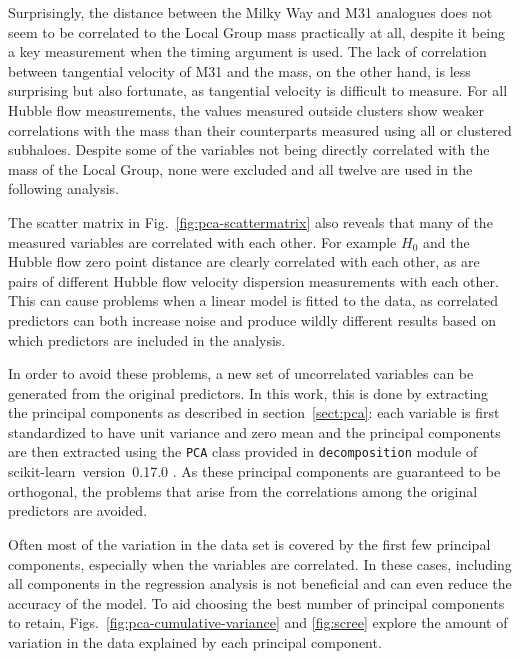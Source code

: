\documentclass[english, twoside]{HYgradu}
\begin{document}
Surprisingly, the distance between the Milky Way and M31 analogues does not seem to be correlated to the Local Group mass practically at all, despite it being a key measurement when the timing argument is used. The lack of correlation between tangential velocity of M31 and the mass, on the other hand, is less surprising but also fortunate, as tangential velocity is difficult to measure. For all Hubble flow measurements, the values measured outside clusters show weaker correlations with the mass than their counterparts measured using all or clustered subhaloes. Despite some of the variables  not being directly correlated with the mass of the Local Group, none were excluded and all twelve are used in the following analysis.

The scatter matrix in Fig.~\ref{fig:pca-scattermatrix} also reveals that many of the measured variables are correlated with each other. For example $H_0$ and the Hubble flow zero point distance are clearly correlated with each other, as are pairs of different Hubble flow velocity dispersion measurements with each other. This can cause problems when a linear model is fitted to the data, as correlated predictors can both increase noise and produce wildly different results based on which predictors are included in the analysis. 

In order to avoid these problems, a new set of uncorrelated variables can be generated from the original predictors. In this work, this is done by extracting the principal components as described in section~\ref{sect:pca}: each variable is first standardized to have unit variance and zero mean and the principal components are then extracted using the \texttt{PCA} class provided in \texttt{decomposition} module of scikit-learn~version~0.17.0 \citep{scikit-learn}. As these principal components are guaranteed to be orthogonal, the problems that arise from the correlations among the original predictors are avoided.

Often most of the variation in the data set is covered by the first few principal components, especially when the variables are correlated. In these cases, including all components in the regression analysis is not beneficial and can even reduce the accuracy of the model. To aid choosing the best number of principal components to retain, Figs.~\ref{fig:pca-cumulative-variance} and \ref{fig:scree} explore the amount of variation in the data explained by each principal component.
\end{document}
